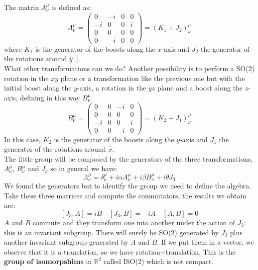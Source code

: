 \documentclass[../main.tex]{subfiles}
\begin{document}
The matrix $A^\mu_\nu$ is defined as:
\[
A^\mu_\nu=\left(\begin{array}{cccc}
    0 & -i & 0 & 0 \\
    -i & 0 & 0 & i \\
    0 & 0 & 0 & 0 \\
    0 & -i & 0 & 0
\end{array}\right)=(K_1+J_2)^\mu_\nu
\]
where $K_1$ is the generator of the boosts along the $x$-axis and $J_2$ the generator of the rotations around $\hat{y}$ [].\\
What other transformations can we do? Another possibility is to perform a SO(2) rotation in the $xy$ plane or a transformation like the previous one but with the initial boost along the $y$-axis, a rotation in the $yz$ plane and a boost along the $z$-axis, defining in this way $B^\mu_\nu$.
\[
B^\mu_\nu=\left(\begin{array}{cccc}
    0 & 0 & -i & 0 \\
    0 & 0 & 0 & 0 \\
    -i & 0 & 0 & i \\
    0 & 0 & -i & 0
\end{array}\right)=(K_2-J_1)^\mu_\nu
\]
In this case, $K_2$ is the generator of the boosts along the $y$-axis and $J_1$ the generator of the rotations around $\hat{x}$.\\
The little group will be composed by the generators of the three transformations, $A^\mu_\nu$, $B^\mu_\nu$ and $J_3$ so in general we have:\marginnote{\[
J_3=\left(\begin{array}{cccc}
    0 & 0 & 0 & 0 \\
    0 & 0 & -i & 0 \\
    0 & +i & 0 & 0 \\
    0 & 0 & 0 & 0
\end{array}\right)
\]}
\[
\Lambda^\mu_\nu=\delta^\mu_\nu+i\alpha A^\mu_\nu+i\beta B^\mu_\nu+i\theta J_3
\]
We found the generators but to identify the group we need to define the algebra. Take these three matrices and compute the commutators, the results we obtain are:
\[
[J_3,A]=iB \quad [J_3,B]=-iA \quad [A,B]=0
\]
$A$ and $B$ commute and they transform one into another under the action of $J_3$: this is an invariant subgroup. There will surely be SO(2) generated by $J_3$ plus another invariant subgroup generated by $A$ and $B$. If we put them in a vector, we observe that it is a translation, so we have rotation+translation. This is the \textbf{group of isomorpshims} in $\mathbb{R}^2$ called ISO(2) which is not compact.\\
\end{document}
